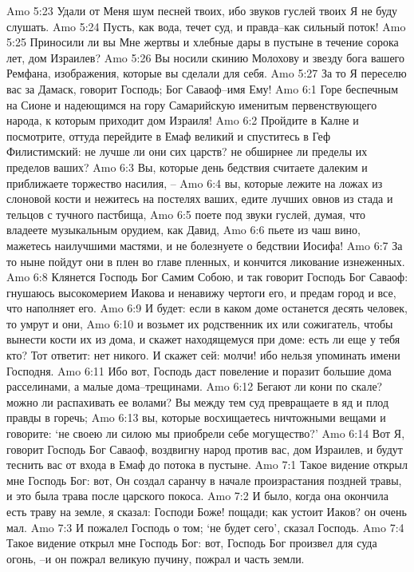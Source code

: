 Amo 5:23  Удали от Меня шум песней твоих, ибо звуков гуслей твоих Я не буду слушать.
Amo 5:24  Пусть, как вода, течет суд, и правда--как сильный поток!
Amo 5:25  Приносили ли вы Мне жертвы и хлебные дары в пустыне в течение сорока лет, дом Израилев?
Amo 5:26  Вы носили скинию Молохову и звезду бога вашего Ремфана, изображения, которые вы сделали для себя.
Amo 5:27  За то Я переселю вас за Дамаск, говорит Господь; Бог Саваоф--имя Ему!
Amo 6:1  Горе беспечным на Сионе и надеющимся на гору Самарийскую именитым первенствующего народа, к которым приходит дом Израиля!
Amo 6:2  Пройдите в Калне и посмотрите, оттуда перейдите в Емаф великий и спуститесь в Геф Филистимский: не лучше ли они сих царств? не обширнее ли пределы их пределов ваших?
Amo 6:3  Вы, которые день бедствия считаете далеким и приближаете торжество насилия, --
Amo 6:4  вы, которые лежите на ложах из слоновой кости и нежитесь на постелях ваших, едите лучших овнов из стада и тельцов с тучного пастбища,
Amo 6:5  поете под звуки гуслей, думая, что владеете музыкальным орудием, как Давид,
Amo 6:6  пьете из чаш вино, мажетесь наилучшими мастями, и не болезнуете о бедствии Иосифа!
Amo 6:7  За то ныне пойдут они в плен во главе пленных, и кончится ликование изнеженных.
Amo 6:8  Клянется Господь Бог Самим Собою, и так говорит Господь Бог Саваоф: гнушаюсь высокомерием Иакова и ненавижу чертоги его, и предам город и все, что наполняет его.
Amo 6:9  И будет: если в каком доме останется десять человек, то умрут и они,
Amo 6:10  и возьмет их родственник их или сожигатель, чтобы вынести кости их из дома, и скажет находящемуся при доме: есть ли еще у тебя кто? Тот ответит: нет никого. И скажет сей: молчи! ибо нельзя упоминать имени Господня.
Amo 6:11  Ибо вот, Господь даст повеление и поразит большие дома расселинами, а малые дома--трещинами.
Amo 6:12  Бегают ли кони по скале? можно ли распахивать ее волами? Вы между тем суд превращаете в яд и плод правды в горечь;
Amo 6:13  вы, которые восхищаетесь ничтожными вещами и говорите: `не своею ли силою мы приобрели себе могущество?'
Amo 6:14  Вот Я, говорит Господь Бог Саваоф, воздвигну народ против вас, дом Израилев, и будут теснить вас от входа в Емаф до потока в пустыне.
Amo 7:1  Такое видение открыл мне Господь Бог: вот, Он создал саранчу в начале произрастания поздней травы, и это была трава после царского покоса.
Amo 7:2  И было, когда она окончила есть траву на земле, я сказал: Господи Боже! пощади; как устоит Иаков? он очень мал.
Amo 7:3  И пожалел Господь о том; `не будет сего', сказал Господь.
Amo 7:4  Такое видение открыл мне Господь Бог: вот, Господь Бог произвел для суда огонь, --и он пожрал великую пучину, пожрал и часть земли.
